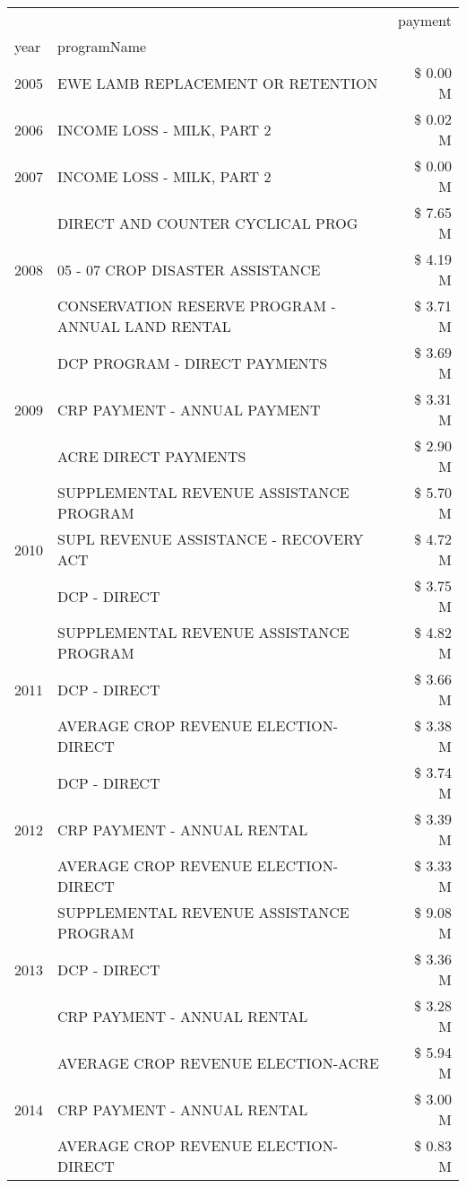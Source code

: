 \begin{tabular}{llr}
\toprule
 &  & payment \\
year & programName &  \\
\midrule
2005 & EWE LAMB REPLACEMENT OR RETENTION & \$ 0.00 M \\
\cline{1-3}
2006 & INCOME LOSS - MILK, PART 2 & \$ 0.02 M \\
\cline{1-3}
2007 & INCOME LOSS - MILK, PART 2 & \$ 0.00 M \\
\cline{1-3}
\multirow[t]{3}{*}{2008} & DIRECT AND COUNTER CYCLICAL PROG & \$ 7.65 M \\
 & 05 - 07 CROP DISASTER ASSISTANCE & \$ 4.19 M \\
 & CONSERVATION RESERVE PROGRAM - ANNUAL LAND RENTAL & \$ 3.71 M \\
\cline{1-3}
\multirow[t]{3}{*}{2009} & DCP PROGRAM - DIRECT PAYMENTS & \$ 3.69 M \\
 & CRP PAYMENT - ANNUAL PAYMENT & \$ 3.31 M \\
 & ACRE DIRECT PAYMENTS & \$ 2.90 M \\
\cline{1-3}
\multirow[t]{3}{*}{2010} & SUPPLEMENTAL REVENUE ASSISTANCE PROGRAM & \$ 5.70 M \\
 & SUPL REVENUE ASSISTANCE - RECOVERY ACT & \$ 4.72 M \\
 & DCP - DIRECT & \$ 3.75 M \\
\cline{1-3}
\multirow[t]{3}{*}{2011} & SUPPLEMENTAL REVENUE ASSISTANCE PROGRAM & \$ 4.82 M \\
 & DCP - DIRECT & \$ 3.66 M \\
 & AVERAGE CROP REVENUE ELECTION-DIRECT & \$ 3.38 M \\
\cline{1-3}
\multirow[t]{3}{*}{2012} & DCP - DIRECT & \$ 3.74 M \\
 & CRP PAYMENT - ANNUAL RENTAL & \$ 3.39 M \\
 & AVERAGE CROP REVENUE ELECTION-DIRECT & \$ 3.33 M \\
\cline{1-3}
\multirow[t]{3}{*}{2013} & SUPPLEMENTAL REVENUE ASSISTANCE PROGRAM & \$ 9.08 M \\
 & DCP - DIRECT & \$ 3.36 M \\
 & CRP PAYMENT - ANNUAL RENTAL & \$ 3.28 M \\
\cline{1-3}
\multirow[t]{3}{*}{2014} & AVERAGE CROP REVENUE ELECTION-ACRE & \$ 5.94 M \\
 & CRP PAYMENT - ANNUAL RENTAL & \$ 3.00 M \\
 & AVERAGE CROP REVENUE ELECTION-DIRECT & \$ 0.83 M \\

\end{tabular}
